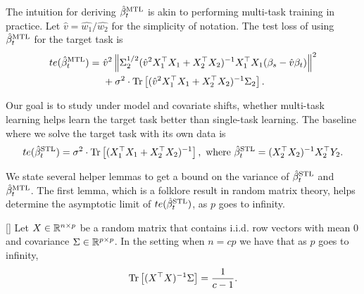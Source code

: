 The intuition for deriving $\hat{\beta}_t^{\text{MTL}}$ is akin to performing multi-task training in practice.
Let $\hat{v} = \hat{w_1} / \hat{w_2}$ for the simplicity of notation.
The test loss of using $\hat{\beta}_t^{\text{MTL}}$ for the target task is
\begin{align}
	te(\hat{\beta}_t^{\text{MTL}}) =&~ \hat{v}^2 \left\| \Sigma_2^{1/2}(\hat{v}^2 X_1^{\top}X_1 + X_2^{\top}X_2)^{-1} X_1^{\top}X_1 (\beta_s - \hat{v} \beta_t) \right\|^2 \nonumber \\
			&~ + \sigma^2 \cdot \operatorname{Tr}\left[(\hat{v}^2 X_1^{\top}X_1 + X_2^{\top}X_2)^{-1} \Sigma_2\right]. \label{eq_te_mtl_2task}
\end{align}

Our goal is to study under model and covariate shifts, whether multi-task learning helps learn the target task better than single-task learning.
The baseline where we solve the target task with its own data is
\begin{align*}
	te(\hat{\beta}_t^{\text{STL}}) = \sigma^2 \cdot \operatorname{Tr}\left[(X_1^{\top}X_1 + X_2^{\top}X_2)^{-1}\right], \text{ where } \hat{\beta}_t^{\text{STL}} = (X_2^{\top}X_2)^{-1} X_2^{\top}Y_2.
\end{align*}

We state several helper lemmas to get a bound on the variance of $\hat{\beta}_t^{\text{STL}}$ and $\hat{\beta}_t^{\text{MTL}}$.
The first lemma, which is a folklore result in random matrix theory, helps determine the asymptotic limit of $te(\hat{\beta}_t^{\text{STL}})$, as $p$ goes to infinity.
\begin{lemma}\label{lem_minv}[]
	Let $X\in\mathbb{R}^{n\times p}$ be a random matrix that contains i.i.d. row vectors with mean $0$ and covariance $\Sigma\in\mathbb{R}^{p\times p}$.
	In the setting when $n = c p$ we have that as $p$ goes to infinity,
	\[ \operatorname{Tr}\left[(X^{\top}X)^{-1}\Sigma\right] = \frac{1}{c - 1}. \]
\end{lemma}


